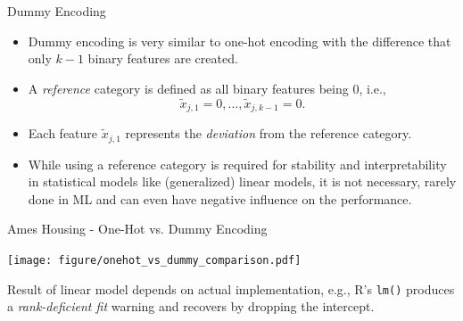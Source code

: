 \begin{vbframe}{Dummy Encoding}

\begin{itemize}
\item Dummy encoding is very similar to one-hot encoding with the difference that only $k-1$ binary features are created.

\item A \textit{reference} category is defined as all binary features being $0$, i.e.,
$$\tilde x_{j,1} = 0, \dots, \tilde x_{j,k-1} = 0.$$

\item Each feature $\tilde x_{j,1}$ represents the \textit{deviation} from the reference category.

\item While using a reference category is required for stability and interpretability in statistical models like (generalized) linear models, it is not necessary, rarely done in ML and can even have negative influence on the performance.
\end{itemize}

\end{vbframe}

\begin{vbframe}{Ames Housing - One-Hot vs. Dummy Encoding}

\vfill

\begin{center}
\texttt{[image: figure/onehot\_vs\_dummy\_comparison.pdf]}
\end{center}

\vfill

Result of linear model depends on actual implementation, e.g., R's \texttt{lm()} produces a \textit{rank-deficient fit} warning and recovers by dropping the intercept.

\end{vbframe}

